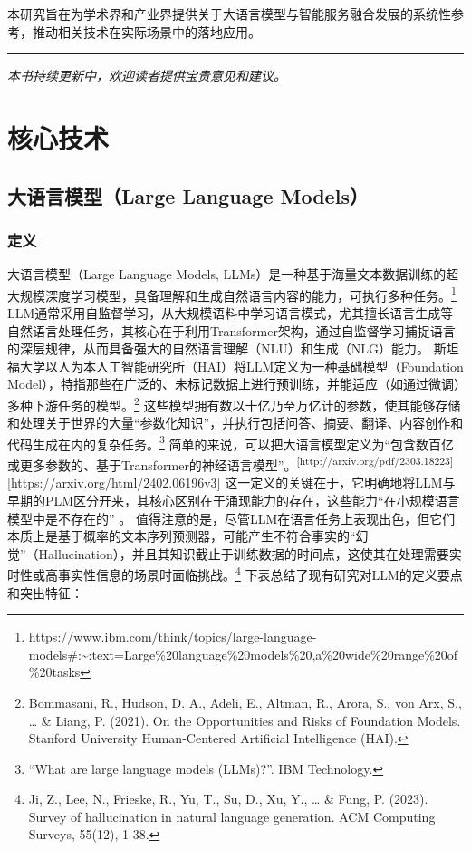 \documentclass[
  letterpaper,
]{scrbook}
\begin{document}

本研究旨在为学术界和产业界提供关于大语言模型与智能服务融合发展的系统性参考，推动相关技术在实际场景中的落地应用。

\begin{center}\rule{0.5\linewidth}{0.5pt}\end{center}

\emph{本书持续更新中，欢迎读者提供宝贵意见和建议。}

\part{核心技术}

\chapter{大语言模型（Large Language Models）}\label{sec-llm}

\section{定义}\label{ux5b9aux4e49}

大语言模型（Large Language Models,
LLMs）是一种基于海量文本数据训练的超大规模深度学习模型，具备理解和生成自然语言内容的能力，可执行多种任务。\footnote{https://www.ibm.com/think/topics/large-language-models\#:\textasciitilde:text=Large\%20language\%20models\%20,a\%20wide\%20range\%20of\%20tasks}
LLM通常采用自监督学习，从大规模语料中学习语言模式，尤其擅长语言生成等自然语言处理任务，其核心在于利用Transformer架构，通过自监督学习捕捉语言的深层规律，从而具备强大的自然语言理解（NLU）和生成（NLG）能力。
斯坦福大学以人为本人工智能研究所（HAI）将LLM定义为一种基础模型（Foundation
Model），特指那些在广泛的、未标记数据上进行预训练，并能适应（如通过微调）多种下游任务的模型。\footnote{Bommasani,
  R., Hudson, D. A., Adeli, E., Altman, R., Arora, S., von Arx, S.,
  \ldots{} \& Liang, P. (2021). On the Opportunities and Risks of
  Foundation Models. Stanford University Human-Centered Artificial
  Intelligence (HAI).}
这些模型拥有数以十亿乃至万亿计的参数，使其能够存储和处理关于世界的大量``参数化知识''，并执行包括问答、摘要、翻译、内容创作和代码生成在内的复杂任务。\footnote{``What
  are large language models (LLMs)?''. IBM Technology.}
简单的来说，可以把大语言模型定义为``包含数百亿或更多参数的、基于Transformer的神经语言模型''。\textsuperscript{{[}http://arxiv.org/pdf/2303.18223{]}}{[}https://arxiv.org/html/2402.06196v3{]}
这一定义的关键在于，它明确地将LLM与早期的PLM区分开来，其核心区别在于涌现能力的存在，这些能力``在小规模语言模型中是不存在的''
。
值得注意的是，尽管LLM在语言任务上表现出色，但它们本质上是基于概率的文本序列预测器，可能产生不符合事实的``幻觉''（Hallucination），并且其知识截止于训练数据的时间点，这使其在处理需要实时性或高事实性信息的场景时面临挑战。\footnote{Ji,
  Z., Lee, N., Frieske, R., Yu, T., Su, D., Xu, Y., \ldots{} \& Fung, P.
  (2023). Survey of hallucination in natural language generation. ACM
  Computing Surveys, 55(12), 1-38.}
下表总结了现有研究对LLM的定义要点和突出特征：
\end{document}

